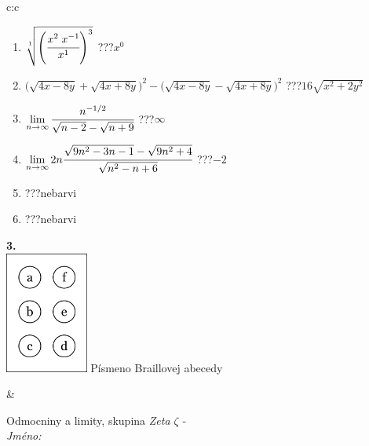 \documentclass[10pt]{report}
\begin{document}
\begin{tabular}{c:c}
\begin{minipage}[c][104.5mm][t]{0.5\linewidth}
\begin{center}
\begin{minipage}{0.79\linewidth}
\begin{center}
\begin{varwidth}{\linewidth}
\begin{enumerate}
\small
\item $\sqrt[1]{\left(\cfrac{x^{2}\;x^{-1}}{x^{1}}\right)^{3}}$\quad \dotfill\; ???\;\dotfill \quad $x^{0}$
\item {\footnotesize{\scriptsize$\big(\sqrt{4x-8y}+\sqrt{4x+8y}\big)^2-\big(\sqrt{4x-8y}-\sqrt{4x+8y}\big)^2$}\quad \dotfill\; ???\;\dotfill \quad $16\sqrt{x^2+2y^2}$}
\item $\lim\limits_{n\to\infty}\cfrac{n^{-1/2}}{\sqrt{n-2}-\sqrt{n+9}}$\quad \dotfill\; ???\;\dotfill \quad $\infty$
\item $\lim\limits_{n\to\infty}2n\cfrac{\sqrt{9n^2-3n-1}-\sqrt{9n^2+4}}{\sqrt{n^2-n+6}}$\quad \dotfill\; ???\;\dotfill \quad $-2$
\item \quad \dotfill\; ???\;\dotfill \quad nebarvi
\item \quad \dotfill\; ???\;\dotfill \quad nebarvi
\end{enumerate}
\end{varwidth}
\end{center}
\end{minipage}
\begin{minipage}{0.20\linewidth}
\begin{center}
{\Huge\bfseries 3.} \\[2mm]
\includegraphics[height=40mm]{../images/braille.png}
{\small Písmeno Braillovej abecedy}
\end{center}
\end{minipage}
\end{center}
\end{minipage}
&
\begin{minipage}[c][104.5mm][t]{0.5\linewidth}
\begin{center}
\vspace{7mm}
{\huge Odmocniny a limity, skupina \textit{Zeta $\zeta$} -}\\[5mm]
\textit{Jméno:}\phantom{xxxxxxxxxxxxxxxxxxxxxxxxxxxxxxxxxxxxxxxxxxxxxxxxxxxxxxxxxxxxxxxxx}\\[5mm]

\end{center}
\end{minipage}
\end{tabular}
\end{document}
